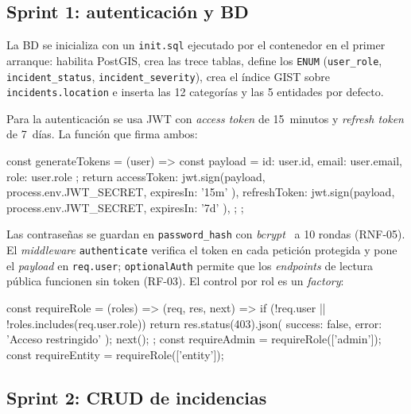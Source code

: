 \subsection{Sprint 1: autenticación y BD}

La BD se inicializa con un \texttt{init.sql} ejecutado por el contenedor en el primer arranque: habilita PostGIS, crea las trece tablas, define los \texttt{ENUM} (\texttt{user\_role}, \texttt{incident\_status}, \texttt{incident\_severity}), crea el índice GIST sobre \texttt{incidents.location} e inserta las 12 categorías y las 5 entidades por defecto.

Para la autenticación se usa JWT con \textit{access token} de 15~minutos y \textit{refresh token} de 7~días. La función que firma ambos:

\begin{jscode}
const generateTokens = (user) => {
  const payload = { id: user.id, email: user.email, role: user.role };
  return {
    accessToken:  jwt.sign(payload, process.env.JWT_SECRET, { expiresIn: '15m' }),
    refreshToken: jwt.sign(payload, process.env.JWT_SECRET, { expiresIn: '7d' }),
  };
};
\end{jscode}
\label{lst:jwt-tokens}

Las contraseñas se guardan en \texttt{password\_hash} con \textit{bcrypt}~\parencite{bcrypt} a 10 rondas (RNF-05). El \textit{middleware} \texttt{authenticate} verifica el token en cada petición protegida y pone el \textit{payload} en \texttt{req.user}; \texttt{optionalAuth} permite que los \textit{endpoints} de lectura pública funcionen sin token (RF-03). El control por rol es un \textit{factory}:

\begin{jscode}
const requireRole = (roles) => (req, res, next) => {
  if (!req.user || !roles.includes(req.user.role))
    return res.status(403).json({ success: false, error: 'Acceso restringido' });
  next();
};
const requireAdmin  = requireRole(['admin']);
const requireEntity = requireRole(['entity']);
\end{jscode}
\label{lst:require-role}


\subsection{Sprint 2: CRUD de incidencias}

